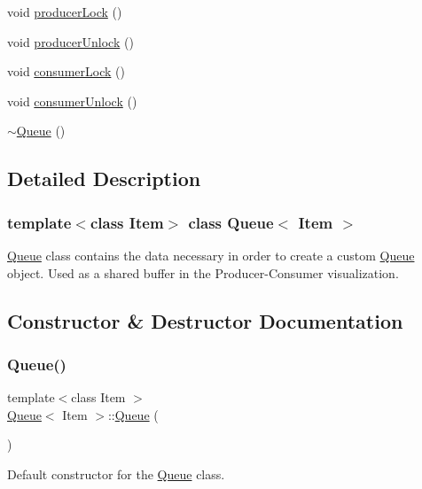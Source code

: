\begin{DoxyCompactItemize}
\item 
void \hyperlink{class_queue_ad2a1705af1b52eb3a8ee18ce3cabb438}{producer\+Lock} ()
\item 
void \hyperlink{class_queue_ae4f04194e932f23edfda69a255b8aabc}{producer\+Unlock} ()
\item 
void \hyperlink{class_queue_aabd949416973cd50003caef588488ce5}{consumer\+Lock} ()
\item 
void \hyperlink{class_queue_af2fc30d17cd216e65174f81bf30077e7}{consumer\+Unlock} ()
\item 
\hyperlink{class_queue_abf6556b17de62227759af86ac8352765}{$\sim$\+Queue} ()
\end{DoxyCompactItemize}


\subsection{Detailed Description}
\subsubsection*{template$<$class Item$>$\newline
class Queue$<$ Item $>$}

\hyperlink{class_queue}{Queue} class contains the data necessary in order to create a custom \hyperlink{class_queue}{Queue} object. Used as a shared buffer in the Producer-\/\+Consumer visualization. 

\subsection{Constructor \& Destructor Documentation}
\mbox{\label{class_queue_a142ee0cc45f8650ef4c5bb7623a1147c}} 
\subsubsection{\texorpdfstring{Queue()}{Queue()}\hspace{0.1cm}{\footnotesize\ttfamily [1/2]}}
{\footnotesize\ttfamily template$<$class Item $>$ \\
\hyperlink{class_queue}{Queue}$<$ Item $>$\+::\hyperlink{class_queue}{Queue} (\begin{DoxyParamCaption}{ }\end{DoxyParamCaption})}

Default constructor for the \hyperlink{class_queue}{Queue} class. \mbox{\label{class_queue_ab79f488d66116888a8879756f7116ffc}} 
